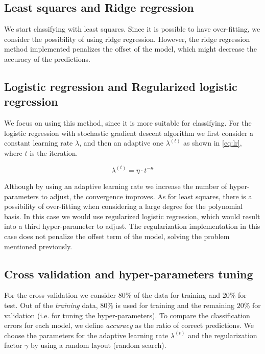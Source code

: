 \documentclass[10pt,conference,compsocconf]{IEEEtran}
\begin{document}
	\subsection{Least squares and Ridge regression} %
	\label{sub:least_squares_and_ridge_regression}
  	We start classifying with least squares. Since it is possible to have over-fitting, we consider the possibility of using ridge regression. However, the ridge regression method implemented penalizes the offset of the model, which might decrease the accuracy of the predictions.

	\subsection{Logistic regression and Regularized logistic regression} %
	\label{sub:logistic_regression_and_regularized_logistic_regression}
  	We focus on using this method, since it is more suitable for classifying. For the logistic regression with stochastic gradient descent algorithm we first consider a constant learning rate $\lambda$, and then an adaptive one $\lambda^{(t)}$ as shown in \ref{eq:lr}, where $t$ is the iteration.

  	\begin{equation}
    	\label{eq:lr}
      	\lambda^{(t)} = \eta \cdot t ^{- \kappa}
  	\end{equation}

  	Although by using an adaptive learning rate we increase the number of hyper-parameters to adjust, the convergence improves.
  	As for least squares, there is a possibility of over-fitting when considering a large degree for the polynomial basis. In this case we would use regularized logistic regression, which would result into a third hyper-parameter to adjust. The regularization implementation in this case does not penalize the offset term of the model, solving the problem mentioned previously.

	\subsection{Cross validation and hyper-parameters tuning} %
	\label{sub:cross_validation_and_hyperparameters_tuning}
  	For the cross validation we consider $80\%$ of the data for training and $20\%$ for test. Out of the \emph{training} data, $80\%$ is used for training and the remaining $20\%$ for validation (i.e. for tuning the hyper-parameters). To compare the classification errors for each model, we define \emph{accuracy} as the ratio of correct predictions.	We choose the parameters for the adaptive learning rate $\lambda^{(t)}$ and the regularization factor $\gamma$ by using a random layout (random search).
\end{document}
